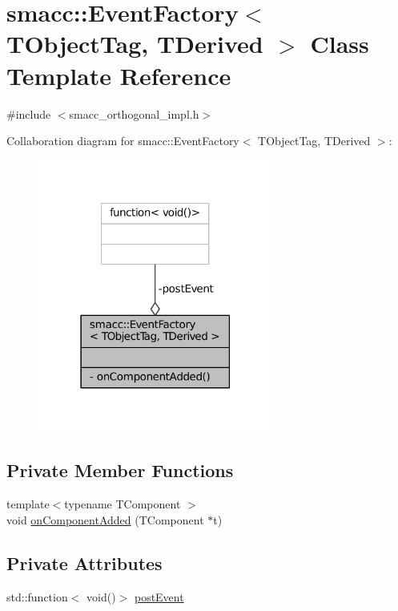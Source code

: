 \hypertarget{classsmacc_1_1EventFactory}{}\section{smacc\+:\+:Event\+Factory$<$ T\+Object\+Tag, T\+Derived $>$ Class Template Reference}
\label{classsmacc_1_1EventFactory}


{\ttfamily \#include $<$smacc\+\_\+orthogonal\+\_\+impl.\+h$>$}



Collaboration diagram for smacc\+:\+:Event\+Factory$<$ T\+Object\+Tag, T\+Derived $>$\+:
\nopagebreak
\begin{figure}[H]
\begin{center}
\leavevmode
\includegraphics[width=219pt]{classsmacc_1_1EventFactory__coll__graph}
\end{center}
\end{figure}
\subsection*{Private Member Functions}
\begin{DoxyCompactItemize}
\item 
{\footnotesize template$<$typename T\+Component $>$ }\\void \hyperlink{classsmacc_1_1EventFactory_ad5cb419271a1cd8d6fddd58bda12a2ca}{on\+Component\+Added} (T\+Component $\ast$t)
\end{DoxyCompactItemize}
\subsection*{Private Attributes}
\begin{DoxyCompactItemize}
\item 
std\+::function$<$ void()$>$ \hyperlink{classsmacc_1_1EventFactory_ad633758137e9574e942422889952a3ba}{post\+Event}
\end{DoxyCompactItemize}


